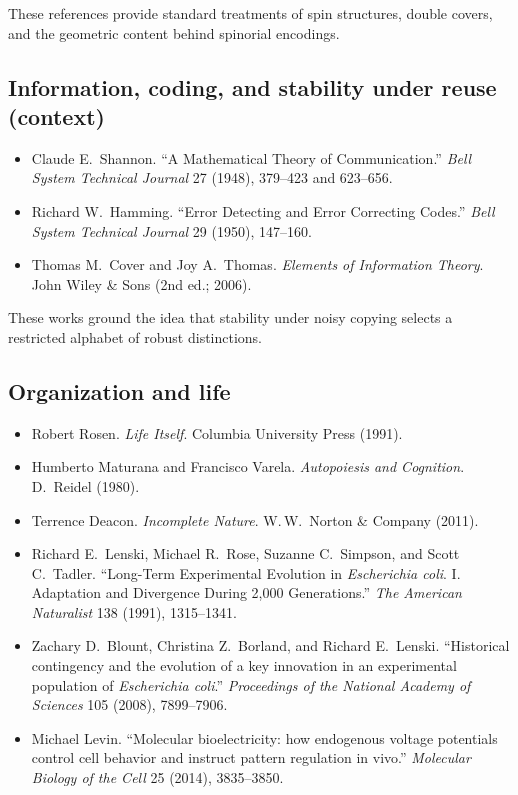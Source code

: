 \documentclass[11pt,twoside,openright]{book}
\begin{document}
\noindent
These references provide standard treatments of spin structures, double covers,
and the geometric content behind spinorial encodings.

\medskip

\subsection*{Information, coding, and stability under reuse (context)}

\begin{itemize}
  \setlength{\itemsep}{0.2em}
  \setlength{\parskip}{0pt}
  \item Claude E.\ Shannon. ``A Mathematical Theory of Communication.'' \emph{Bell System Technical Journal} 27 (1948), 379--423 and 623--656.
  \item Richard W.\ Hamming. ``Error Detecting and Error Correcting Codes.'' \emph{Bell System Technical Journal} 29 (1950), 147--160.
  \item Thomas M.\ Cover and Joy A.\ Thomas. \emph{Elements of Information Theory}. John Wiley \& Sons (2nd ed.; 2006).
\end{itemize}

\noindent
These works ground the idea that stability under noisy copying selects a
restricted alphabet of robust distinctions.

\medskip

\subsection*{Organization and life}

\begin{itemize}
  \setlength{\itemsep}{0.2em}
  \setlength{\parskip}{0pt}
  \item Robert Rosen. \emph{Life Itself}. Columbia University Press (1991).
  \item Humberto Maturana and Francisco Varela. \emph{Autopoiesis and Cognition}. D.\ Reidel (1980).
  \item Terrence Deacon. \emph{Incomplete Nature}. W.\,W.\ Norton \& Company (2011).
  \item Richard E.\ Lenski, Michael R.\ Rose, Suzanne C.\ Simpson, and Scott C.\ Tadler. ``Long-Term Experimental Evolution in \emph{Escherichia coli}. I. Adaptation and Divergence During 2,000 Generations.'' \emph{The American Naturalist} 138 (1991), 1315--1341.
  \item Zachary D.\ Blount, Christina Z.\ Borland, and Richard E.\ Lenski. ``Historical contingency and the evolution of a key innovation in an experimental population of \emph{Escherichia coli}.'' \emph{Proceedings of the National Academy of Sciences} 105 (2008), 7899--7906.
  \item Michael Levin. ``Molecular bioelectricity: how endogenous voltage potentials control cell behavior and instruct pattern regulation in vivo.'' \emph{Molecular Biology of the Cell} 25 (2014), 3835--3850.
\end{itemize}
\end{document}
